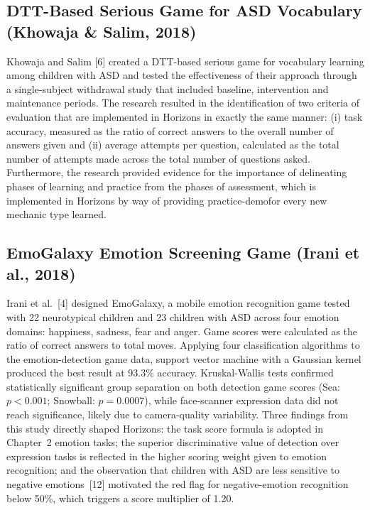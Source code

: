 \documentclass[12pt,a4paper,oneside]{report}
\begin{document}
\subsection{DTT-Based Serious Game for ASD Vocabulary (Khowaja \& Salim, 2018)}

Khowaja and Salim [6] created a DTT-based serious game for vocabulary learning among children with ASD and tested the effectiveness of their approach through a single-subject withdrawal study that included baseline, intervention and maintenance periods. The research resulted in the identification of two criteria of evaluation that are implemented in Horizons in exactly the same manner: (i) task accuracy, measured as the ratio of correct answers to the overall number of answers given and (ii) average attempts per question, calculated as the total number of attempts made across the total number of questions asked. Furthermore, the research provided evidence for the importance of delineating phases of learning and practice from the phases of assessment, which is implemented in Horizons by way of providing practice-demofor every new mechanic type learned.

\subsection{EmoGalaxy Emotion Screening Game (Irani et al., 2018)}

Irani et al.~[4] designed EmoGalaxy, a mobile emotion recognition game tested with 22 neurotypical children and 23 children with ASD across four emotion domains: happiness, sadness, fear and anger. Game scores were calculated as the ratio of correct answers to total moves. Applying four classification algorithms to the emotion-detection game data, support vector machine with a Gaussian kernel produced the best result at 93.3\% accuracy. Kruskal-Wallis tests confirmed statistically significant group separation on both detection game scores (Sea: $p < 0.001$; Snowball: $p = 0.0007$), while face-scanner expression data did not reach significance, likely due to camera-quality variability. Three findings from this study directly shaped Horizons: the task score formula is adopted in Chapter~2 emotion tasks; the superior discriminative value of detection over expression tasks is reflected in the higher scoring weight given to emotion recognition; and the observation that children with ASD are less sensitive to negative emotions~[12] motivated the red flag for negative-emotion recognition below 50\%, which triggers a score multiplier of 1.20.
\end{document}
